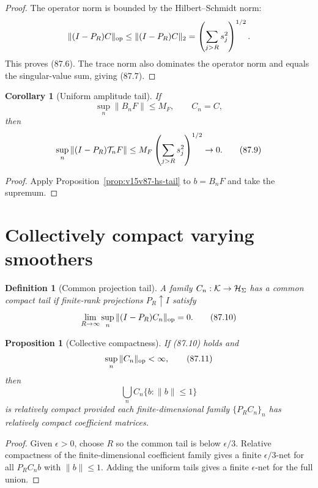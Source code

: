 \documentclass[11pt]{article}
\newtheorem{proposition}[theorem]{Proposition}
\newtheorem{corollary}[theorem]{Corollary}
\newtheorem{definition}[theorem]{Definition}
\theoremstyle{remark}
\begin{document}
\begin{proof}
The operator norm is bounded by the Hilbert--Schmidt norm:
\[
 \|(I-P_R)C\|_{\rm op}
 \leq\|(I-P_R)C\|_2
 =
 \left(\sum_{j>R}s_j^2\right)^{1/2}.
\]
This proves (87.6).  The trace norm also dominates the operator
norm and equals the singular-value sum, giving (87.7).
\end{proof}

\begin{corollary}[Uniform amplitude tail]
\label{cor:v15v87-amplitude-tail}
If
\[
 \sup_n\|B_nF\|\leq M_F,\qquad C_n=C,                 \tag{87.8}
\]
then
\[
 \sup_n\|(I-P_R){\cal T}_nF\|
 \leq
 M_F\left(\sum_{j>R}s_j^2\right)^{1/2}\to0.           \tag{87.9}
\]
\end{corollary}

\begin{proof}
Apply Proposition~\ref{prop:v15v87-hs-tail} to
\(b=B_nF\) and take the supremum.
\end{proof}

\section{Collectively compact varying smoothers}

\begin{definition}[Common projection tail]
\label{def:v15v87-common-tail}
A family \(C_n:{\cal K}\to{\cal H}_\Sigma\) has a common compact
tail if finite-rank projections \(P_R\uparrow I\) satisfy
\[
 \lim_{R\to\infty}\sup_n
 \|(I-P_R)C_n\|_{\rm op}=0.                           \tag{87.10}
\]
\end{definition}

\begin{proposition}[Collective compactness]
\label{prop:v15v87-collective}
If (87.10) holds and
\[
 \sup_n\|C_n\|_{\rm op}<\infty,                       \tag{87.11}
\]
then
\[
 \bigcup_nC_n\{b:\|b\|\leq1\}
\]
is relatively compact provided each finite-dimensional family
\(\{P_RC_n\}_n\) has relatively compact coefficient matrices.
\end{proposition}

\begin{proof}
Given \(\epsilon>0\), choose \(R\) so the common tail is below
\(\epsilon/3\).  Relative compactness of the finite-dimensional
coefficient family gives a finite \(\epsilon/3\)-net for all
\(P_RC_nb\) with \(\|b\|\leq1\).  Adding the uniform tails gives a
finite \(\epsilon\)-net for the full union.
\end{proof}
\end{document}

